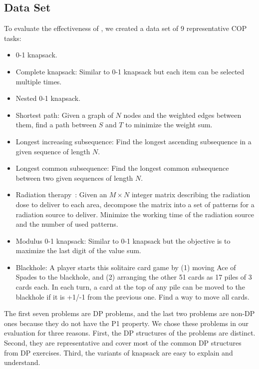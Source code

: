 \subsection{Data Set}\label{sec:data}
To evaluate the effectiveness of \tool, we created a data set of 9 representative COP tasks:  %
\begin{itemize}
    \item 0-1 knapsack.
    \item Complete knapsack: Similar to 0-1 knapsack but  each item can be selected multiple times. 
    \item Nested 0-1 knapsack.
    \item Shortest path: 
    Given a graph of $N$ nodes and the weighted edges between them, 
     find a path between $S$ and $T$ 
    to minimize the weight sum. 
    \item Longest increasing subsequence:
    Find the longest ascending subsequence in a given sequence of length $N$.  
    \item Longest common subsequence: Find the longest common subsequence between two given sequences of length $N$.
\item Radiation therapy~\cite{Baatar:2007}:
    Given an $M\times N$ integer matrix describing the radiation dose to deliver to each area, decompose the matrix into 
   a set of patterns for a radiation source to deliver. 
   Minimize the working time of the radiation source and the number of used patterns.
    \item Modulus 0-1 knapsack: Similar to 0-1 knapsack but the objective is to maximize the last digit of the value sum. 
    
    \item Blackhole:    
    A player starts this solitaire card game by (1) moving Ace of Spades to the blackhole,
    and (2) arranging the other 51 cards as 17 piles of 3 cards each. 
    In each turn, a card at the top of any pile can be moved to the blackhole if it is +1/-1 from the previous one. Find a way to move all cards.
\end{itemize}
The first seven problems are DP problems, and the last two problems are non-DP ones because they do not have the P1 property. 
We chose these problems in our evaluation for three reasons. First, 
the DP structures of the problems are distinct.
Second, they are representative and cover most of the common DP structures from DP exercises.
Third, the variants of knapsack are easy to explain and understand. 

